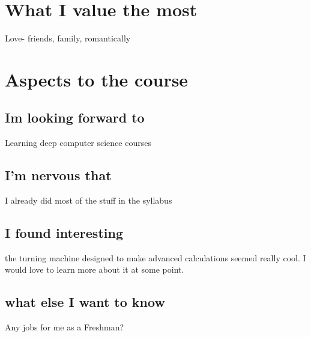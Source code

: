\documentclass{article}
\begin{document}
\begin{center}
    

\section{What I value the most}
Love- friends, family, romantically
\section{Aspects to the course
}
\subsection{Im looking forward to}
Learning deep computer science courses
\subsection{I'm nervous that}
I already did most of the stuff in the syllabus
\subsection{I found interesting}
the turning machine designed to make advanced calculations seemed really cool. I would love to learn more about it at some point.
\subsection{what else I want to know}
Any jobs for me as a Freshman?
\end{center}
\end{document}
